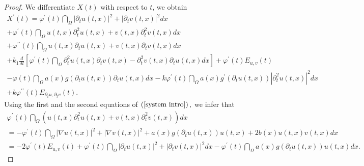 \documentclass[11pt,reqno]{amsart}
\theoremstyle{plain}
\numberwithin{equation}{section}
\numberwithin{equation}{section}
\begin{document}
\begin{proof}
We differentiate $X\left( t\right) $ with respect to $t$, we obtain%
\begin{equation}
\begin{array}{l}
X^{\prime }\left( t\right) =\varphi ^{\prime }\left( t\right) \dint_{\Omega
}\left\vert \partial _{t}u\left( t,x\right) \right\vert ^{2}+\left\vert
\partial _{t}v\left( t,x\right) \right\vert ^{2}dx \\ 
+\varphi ^{\prime }\left( t\right) \dint_{\Omega }u\left( t,x\right)
\partial _{t}^{2}u\left( t,x\right) +v\left( t,x\right) \partial
_{t}^{2}v\left( t,x\right) dx \\ 
+\varphi ^{\prime \prime }\left( t\right) \dint_{\Omega }u\left( t,x\right)
\partial _{t}u\left( t,x\right) +v\left( t,x\right) \partial _{t}v\left(
t,x\right) dx \\ 
+k_{1}\frac{d}{dt}\left[ \varphi ^{\prime }\left( t\right) \dint_{\Omega
}\partial _{t}^{2}u\left( t,x\right) \partial _{t}v\left( t,x\right)
-\partial _{t}^{2}v\left( t,x\right) \partial _{t}u\left( t,x\right) dx%
\right] +\varphi ^{\prime }\left( t\right) E_{u,v}\left( t\right) \\ 
-\varphi \left( t\right) \dint_{\Omega }a\left( x\right) g\left( \partial
_{t}u\left( t,x\right) \right) \partial _{t}u\left( t,x\right) dx-k\varphi
^{\prime }\left( t\right) \dint_{\Omega }a\left( x\right) g^{\prime }\left(
\partial _{t}u\left( t,x\right) \right) \left\vert \partial _{t}^{2}u\left(
t,x\right) \right\vert ^{2}dx \\ 
+k\varphi ^{\prime \prime }\left( t\right) E_{\partial _{t}u,\partial
_{t}v}\left( t\right) .%
\end{array}
\label{Xt derivative}
\end{equation}%
Using the first and the second equations of $\left( \ref{system intro}%
\right) ,$ we infer that%
\begin{equation*}
\begin{array}{l}
\varphi ^{\prime }\left( t\right) \dint_{\Omega }\left( u\left( t,x\right)
\partial _{t}^{2}u\left( t,x\right) +v\left( t,x\right) \partial
_{t}^{2}v\left( t,x\right) \right) dx \\ 
=-\varphi ^{\prime }\left( t\right) \dint_{\Omega }\left\vert \nabla u\left(
t,x\right) \right\vert ^{2}+\left\vert \nabla v\left( t,x\right) \right\vert
^{2}+a\left( x\right) g\left( \partial _{t}u\left( t,x\right) \right)
u\left( t,x\right) +2b\left( x\right) u\left( t,x\right) v\left( t,x\right)
dx \\ 
=-2\varphi ^{\prime }\left( t\right) E_{u,v}\left( t\right) +\varphi
^{\prime }\left( t\right) \dint_{\Omega }\left\vert \partial _{t}u\left(
t,x\right) \right\vert ^{2}+\left\vert \partial _{t}v\left( t,x\right)
\right\vert ^{2}dx-\varphi ^{\prime }\left( t\right) \dint_{\Omega }a\left(
x\right) g\left( \partial _{t}u\left( t,x\right) \right) u\left( t,x\right)
dx.%
\end{array}%
\end{equation*}


\end{proof}
\end{document}
